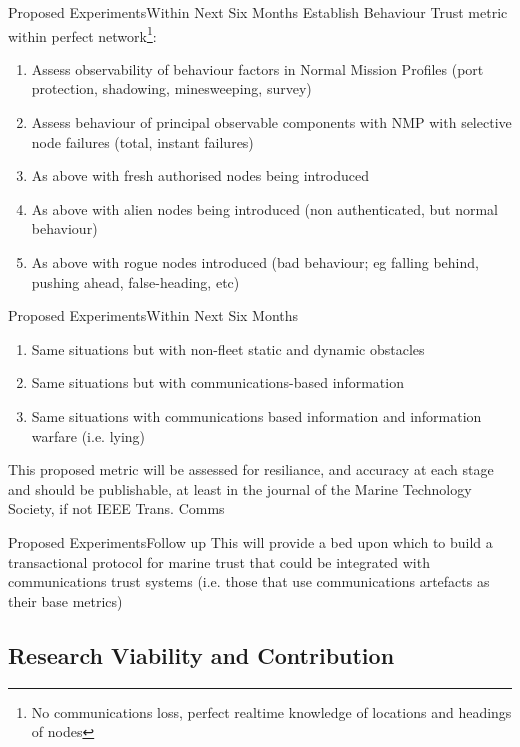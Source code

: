 \documentclass[10pt]{beamer}
\begin{document}
\begin{frame}{Proposed Experiments}{Within Next Six Months}
    Establish Behaviour Trust metric within perfect network\footnote{No communications loss, perfect realtime knowledge of locations and headings of nodes}:
      \begin{enumerate}
        \item Assess observability of behaviour factors in Normal Mission Profiles (port protection, shadowing, minesweeping, survey)
        \item Assess behaviour of principal observable components with NMP with selective node failures (total, instant failures)
        \item As above with fresh authorised nodes being introduced
        \item As above with alien nodes being introduced (non authenticated, but normal behaviour)
        \item As above with rogue nodes introduced (bad behaviour; eg falling behind, pushing ahead, false-heading, etc)
      \end{enumerate}
\end{frame}
\begin{frame}{Proposed Experiments}{Within Next Six Months}
    \begin{enumerate}
      \item Same situations but with non-fleet static and dynamic obstacles
      \item Same situations but with communications-based information
      \item Same situations with communications based information and information warfare (i.e. lying)
    \end{enumerate}
    This proposed metric will be assessed for resiliance, and accuracy  at each stage and should be publishable, at least in the journal of the Marine Technology Society, if not IEEE Trans. Comms
\end{frame}
\begin{frame}{Proposed Experiments}{Follow up}
  This will provide a bed upon which to build a transactional protocol for marine trust that could be integrated with communications trust systems (i.e. those that use communications artefacts as their base metrics)
\end{frame}

\subsection{Research Viability and Contribution}
\end{document}
